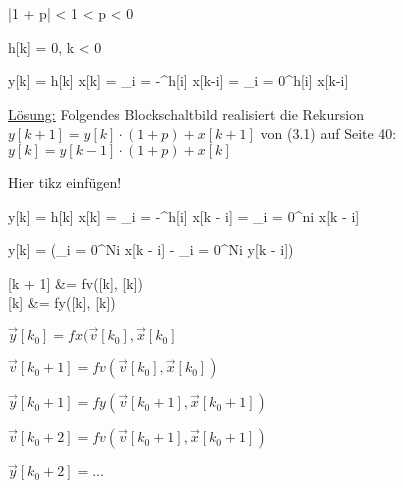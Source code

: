 \begin{abox}
	\left|1 + p\right| < 1\quad{} < p < 0
\end{abox}

\begin{abox}
	h[k] = 0, \quad\forall k < 0
\end{abox}

\begin{abox}
	y[k] = h[k] \ast x[k] = \sum_{i = -\infty}^{\infty}h[i] \cdot x[k-i] = \sum_{i = 0}^{\infty}h[i] \cdot x[k-i]
\end{abox}

\begin{tbox}
	\underline{Lösung:} Folgendes Blockschaltbild realisiert die Rekursion $ y[k + 1] = y[k] \cdot (1 + p) + x[k + 1] $ von (3.1) auf Seite 40: $ y[k] = y[k - 1] \cdot (1 + p) + x[k] $
	
	Hier tikz einfügen!
\end{tbox}

\begin{abox}
	y[k] = h[k] \ast x[k] = \sum_{i = -\infty}^{\infty}h[i] \cdot x[k - i] = \sum_{i = 0}^{n}\beta i \cdot x[k - i]
\end{abox}

\begin{abox}
	y[k] =  \cdot \left(\sum_{i = 0}^{N}\beta i \cdot x[k - i] - \sum_{i = 0}^{N}\alpha i \cdot y[k - i]\right)
\end{abox}

\begin{abox}
	[k + 1] &= fv(, )\\
	 &= fy(, )
\end{abox}

\begin{tbox}
	\begin{enumerate*}[label=\Roman*), series = tobecont]
		\item $ \vec{y}[k_0] = fx(\vec{v}[k_0], \vec{x}[k_0] $
		\item $ \vec{v}[k_0 + 1] = fv(\vec{v}[k_0], \vec{x}[k_0]) $
	\end{enumerate*}
	\begin{enumerate*}[label=\Roman*), resume = tobecont]
		\item $ \vec{y}[k_0 + 1] = fy(\vec{v}[k_0 + 1], \vec{x}[k_0 + 1]) $
		\item $ \vec{v}[k_0 + 2] = fv(\vec{v}[k_0 + 1], \vec{x}[k_0 + 1]) $
	\end{enumerate*}
	\begin{enumerate*}[label=\Roman*), resume = tobecont]
		\item $ \vec{y}[k_0 + 2] = \dots $
	\end{enumerate*}
\end{tbox}

